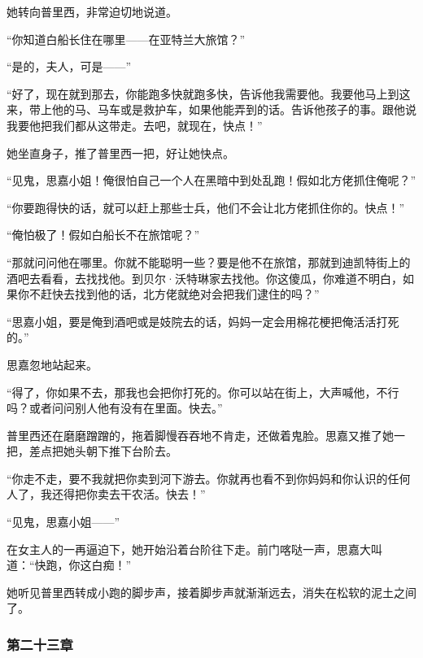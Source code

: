 \par 她转向普里西，非常迫切地说道。
\par “你知道白船长住在哪里——在亚特兰大旅馆？”
\par “是的，夫人，可是——”
\par “好了，现在就到那去，你能跑多快就跑多快，告诉他我需要他。我要他马上到这来，带上他的马、马车或是救护车，如果他能弄到的话。告诉他孩子的事。跟他说我要他把我们都从这带走。去吧，就现在，快点！”
\par 她坐直身子，推了普里西一把，好让她快点。
\par “见鬼，思嘉小姐！俺很怕自己一个人在黑暗中到处乱跑！假如北方佬抓住俺呢？”
\par “你要跑得快的话，就可以赶上那些士兵，他们不会让北方佬抓住你的。快点！”
\par “俺怕极了！假如白船长不在旅馆呢？”
\par “那就问问他在哪里。你就不能聪明一些？要是他不在旅馆，那就到迪凯特街上的酒吧去看看，去找找他。到贝尔·沃特琳家去找他。你这傻瓜，你难道不明白，如果你不赶快去找到他的话，北方佬就绝对会把我们逮住的吗？”
\par “思嘉小姐，要是俺到酒吧或是妓院去的话，妈妈一定会用棉花梗把俺活活打死的。”
\par 思嘉忽地站起来。
\par “得了，你如果不去，那我也会把你打死的。你可以站在街上，大声喊他，不行吗？或者问问别人他有没有在里面。快去。”
\par 普里西还在磨磨蹭蹭的，拖着脚慢吞吞地不肯走，还做着鬼脸。思嘉又推了她一把，差点把她头朝下推下台阶去。
\par “你走不走，要不我就把你卖到河下游去。你就再也看不到你妈妈和你认识的任何人了，我还得把你卖去干农活。快去！”
\par “见鬼，思嘉小姐——”
\par 在女主人的一再逼迫下，她开始沿着台阶往下走。前门喀哒一声，思嘉大叫道：“快跑，你这白痴！”
\par 她听见普里西转成小跑的脚步声，接着脚步声就渐渐远去，消失在松软的泥土之间了。

\subsubsection{第二十三章}

